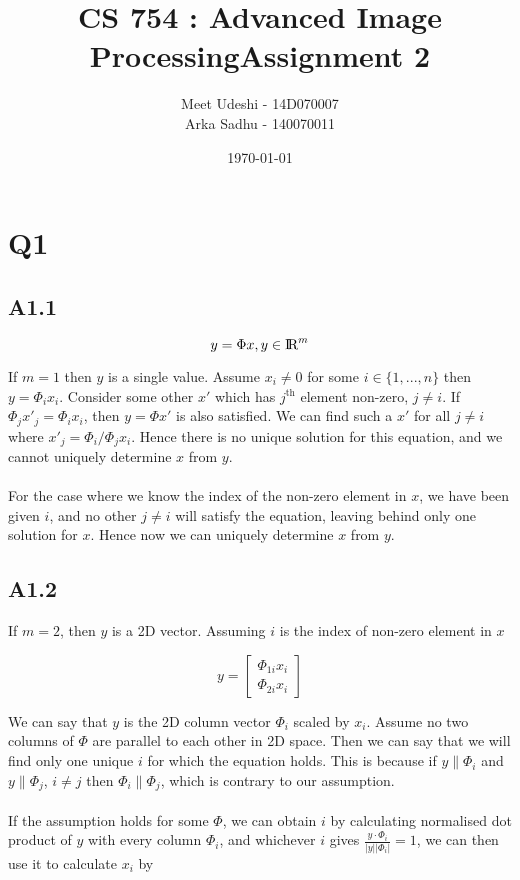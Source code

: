\documentclass{article}
\title{CS 754 : Advanced Image ProcessingAssignment 2}
\author{Meet Udeshi - 14D070007\\
  Arka Sadhu - 140070011\\
}
\date{\today}
\begin{document}
\maketitle

\section*{Q1}
\subsection*{A1.1}

$$ y = \Phi x, y\in \text{I\!R}^{m}$$

If $m=1$ then $y$ is a single value. Assume $x_i\neq 0$ for some $i \in \{1,...,n\}$
then $y = \Phi_i x_i$.
Consider some other $x'$ which has $j^{\text{th}}$ element non-zero, $j\neq i$.
If $\Phi_j x'_j = \Phi_i x_i$, then $y=\Phi x'$ is also satisfied. We can find
such a $x'$ for all $j\neq i$ where $x'_j = \Phi_i/\Phi_j x_i$.
Hence there is no unique solution for this equation, and we cannot uniquely determine $x$ from
$y$.
\\
\\
For the case where we know the index of the non-zero element in $x$, we have been given
$i$, and no other $j\neq i$ will satisfy the equation, leaving behind only one solution for $x$. Hence now we can uniquely determine $x$ from $y$.

\subsection*{A1.2}

If $m=2$, then $y$ is a 2D vector. Assuming $i$ is the index of non-zero element in
$x$

$$ y = \left[ 
            \begin{array}{c}
                \Phi_{1i}x_i\\
                \Phi_{2i}x_i
            \end{array} 
       \right] 
$$

We can say that $y$ is the 2D column vector $\Phi_i$ scaled by $x_i$. Assume no two columns
of $\Phi$ are parallel to each other in 2D space. Then we can say that we will find only
one unique $i$ for which the equation holds. This is because if $y \| \Phi_i$ and
$y \| \Phi_j$, $i\neq j$ then $\Phi_i \| \Phi_j$, which is contrary to our assumption.
\\
\\
If the assumption holds for some $\Phi$, we can obtain $i$ by calculating
normalised dot product of $y$ with every column $\Phi_i$, and whichever $i$ gives
 $\frac{y\cdot\Phi_i}{|y||\Phi_i|} = 1$, we can then use it to calculate $x_i$ by
\end{document}
